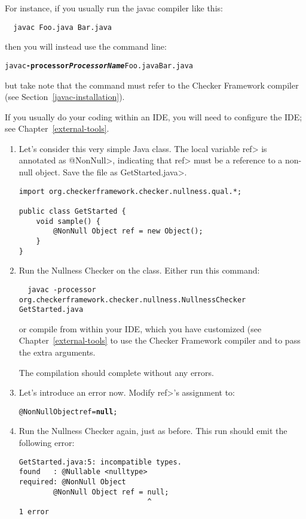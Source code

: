 For instance, if you usually run the javac compiler like
this:

\begin{Verbatim}
  javac Foo.java Bar.java
\end{Verbatim}

\noindent
then you will instead use the command line:

\begin{alltt}
  javac \textbf{-processor \textit{ProcessorName}} Foo.java Bar.java
\end{alltt}

\noindent
but take note that the  command must refer to the
Checker Framework compiler (see Section~\ref{javac-installation}).

If you usually do your coding within an IDE, you will need to configure
the IDE; see Chapter~\ref{external-tools}.


\begin{enumerate}
\item
  Let's consider this very simple Java class.  The local variable \<ref> is
  annotated as \<@NonNull>, indicating that \<ref> must be a reference to a
  non-null object.  Save the file as \<GetStarted.java>.

\begin{Verbatim}
import org.checkerframework.checker.nullness.qual.*;

public class GetStarted {
    void sample() {
        @NonNull Object ref = new Object();
    }
}
\end{Verbatim}

\item
  Run the Nullness Checker on the class.
  Either run this command:
\begin{Verbatim}
  javac -processor org.checkerframework.checker.nullness.NullnessChecker GetStarted.java
\end{Verbatim}

\noindent
or compile from within your IDE, which you have customized (see
Chapter~\ref{external-tools} to use the
Checker Framework compiler and to pass the extra arguments.

  The compilation should complete without any errors.

\item
  Let's introduce an error now.  Modify \<ref>'s assignment to:
\begin{alltt}
  @NonNull Object ref = \textbf{null};
\end{alltt}

\item
  Run the Nullness Checker again, just as before.  This run should emit
  the following error:
\begin{Verbatim}
GetStarted.java:5: incompatible types.
found   : @Nullable <nulltype>
required: @NonNull Object
        @NonNull Object ref = null;
                              ^
1 error
\end{Verbatim}

\end{enumerate}

